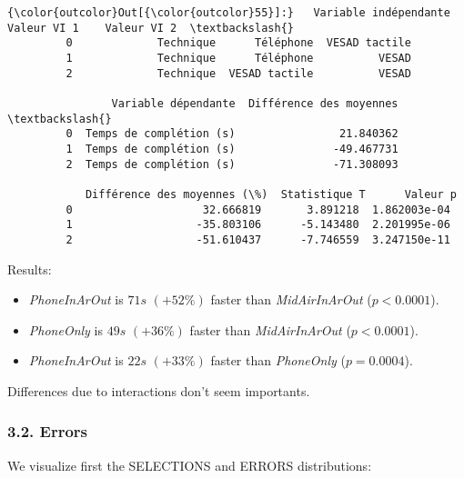 \documentclass[letterpaper, 11pt]{article}
\providecommand{\tightlist}{%
      \setlength{\itemsep}{0pt}\setlength{\parskip}{0pt}}
\begin{document}
\begin{Verbatim}[commandchars=\\\{\}]
{\color{outcolor}Out[{\color{outcolor}55}]:}   Variable indépendante    Valeur VI 1    Valeur VI 2  \textbackslash{}
         0             Technique      Téléphone  VESAD tactile   
         1             Technique      Téléphone          VESAD   
         2             Technique  VESAD tactile          VESAD   
         
                Variable dépendante  Différence des moyennes  \textbackslash{}
         0  Temps de complétion (s)                21.840362   
         1  Temps de complétion (s)               -49.467731   
         2  Temps de complétion (s)               -71.308093   
         
            Différence des moyennes (\%)  Statistique T      Valeur p  
         0                    32.666819       3.891218  1.862003e-04  
         1                   -35.803106      -5.143480  2.201995e-06  
         2                   -51.610437      -7.746559  3.247150e-11  
\end{Verbatim}
            
    Results:

\begin{itemize}
\tightlist
\item
  \emph{PhoneInArOut} is \(71 s\) \((+52\%)\) faster than
  \emph{MidAirInArOut} (\(p < 0.0001\)).
\item
  \emph{PhoneOnly} is \(49 s\) \((+36\%)\) faster than
  \emph{MidAirInArOut} (\(p < 0.0001\)).
\item
  \emph{PhoneInArOut} is \(22 s\) \((+33\%)\) faster than
  \emph{PhoneOnly} (\(p = 0.0004\)).
\end{itemize}

Differences due to interactions don't seem importants.

    \subsubsection{3.2. Errors}\label{errors}

    We visualize first the SELECTIONS and ERRORS distributions:
\end{document}

